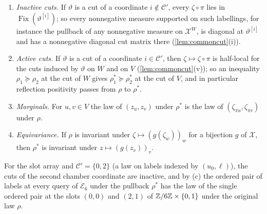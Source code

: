 \begin{lemma}
\begin{enumerate}[label=(\roman*)]
\begin{enumerate}[label=(\alph*)]
 \item \emph{Inactive cuts.} If $\vartheta$ is a cut of a coordinate
  $i\notin\mathcal C'$, every $\zeta\circ\pi$ lies in
  $\operatorname{Fix}(\vartheta^{[i]})$; so every nonnegative measure supported
  on such labellings, for instance the pullback of any nonnegative measure on
  $\mathcal X^W$, is diagonal at $\vartheta^{[i]}$ and has a nonnegative
  diagonal cut matrix there (\cref{lem:commoncut}(i)).
 \item \emph{Active cuts.} If $\vartheta$ is a cut of a coordinate
  $i\in\mathcal C'$, then $\zeta\mapsto\zeta\circ\pi$ is half-local for the cuts
  induced by $\vartheta$ on $W$ and on $V$ (\cref{lem:commoncut}(v)); so an
  inequality $\rho_1\succeq\rho_2$ at the cut of $W$ gives $\rho_1^*\succeq\rho_2^*$
  at the cut of $V$, and in particular reflection positivity passes from
  $\rho$ to $\rho^*$.
 \item \emph{Marginals.} For $u,v\in V$ the law of $(z_u,z_v)$ under $\rho^*$ is
  the law of $(\zeta_{\pi u},\zeta_{\pi v})$ under $\rho$.
 \item \emph{Equivariance.} If $\rho$ is invariant under
  $\zeta\mapsto(g(\zeta_w))_w$ for a bijection $g$ of $\mathcal X$, then $\rho^*$
  is invariant under $z\mapsto(g(z_v))_v$.
 \end{enumerate}
 For the slot array and $\mathcal C'=\{0,2\}$ (a law on labels indexed by
 $(u_0,\ell)$), the cuts of the second chamber coordinate are inactive, and by
 (c) the ordered pair of labels at every query of $\mathcal E_6$ under the
 pullback $\rho^*$ has the law of the single ordered pair at the slots
 $(0,0)$ and $(2,1)$ of $\mathbb Z/6\mathbb Z\times\{0,1\}$ under the original law $\rho$.
\end{enumerate}
\end{lemma}

